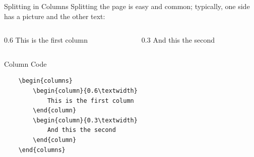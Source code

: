 \begin{frame}[fragile]{Splitting in Columns}
    Splitting the page is easy and common;
    typically, one side has a picture and the other text:
    \begin{columns}
        \begin{column}{0.6\textwidth}
            This is the first column
        \end{column}
        \begin{column}{0.3\textwidth}
            And this the second
        \end{column}
    \end{columns}
    \begin{block}{Column Code}
        \begin{verbatim}
    \begin{columns}
        \begin{column}{0.6\textwidth}
            This is the first column
        \end{column}
        \begin{column}{0.3\textwidth}
            And this the second
        \end{column}
    \end{columns}
    \end{verbatim}
    \end{block}
\end{frame}